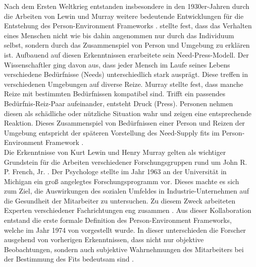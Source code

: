 Nach dem Ersten Weltkrieg entstanden insbesondere in den 1930er-Jahren durch die Arbeiten von Lewin und Murray weitere bedeutende Entwicklungen für die Entstehung des Person-Environment Frameworks \cite[S. 1]{edwards:1990}. \textcite[S. 11f.]{lewin:1936} stellte fest, dass das Verhalten eines Menschen nicht wie bis dahin angenommen nur durch das Individuum selbst, sondern durch das Zusammenspiel von Person und Umgebung zu erklären ist. Aufbauend auf diesen Erkenntnissen erarbeitete \textcite[S. 38ff.]{murray:1938} sein Need-Press-Modell. Der Wissenschaftler ging davon aus, dass jeder Mensch im Laufe seines Lebens verschiedene Bedürfnisse (Needs) unterschiedlich stark ausprägt. Diese treffen in verschiedenen Umgebungen auf diverse Reize. Murray stellte fest, dass manche Reize mit bestimmten Bedürfnissen kompatibel sind. Trifft ein passendes Bedürfnis-Reiz-Paar aufeinander, entsteht Druck (Press). Personen nehmen diesen als schädliche oder nützliche Situation wahr und zeigen eine entsprechende Reaktion. Dieses Zusammenspiel von Bedürfnissen einer Person und Reizen der Umgebung entspricht der späteren Vorstellung des Need-Supply fits im Person-Environment Framework \cite[S. 8]{edwards:2008}. \\
Die Erkenntnisse von Kurt Lewin und Henry Murray gelten als wichtiger Grundstein für die Arbeiten verschiedener Forschungsgruppen rund um John R. P. French, Jr. \cite[S. 5]{caplan:1993}. Der Psychologe stellte im Jahr 1963 an der Universität in Michigan ein groß angelegtes Forschungsprogramm vor. Dieses machte es sich zum Ziel, die Auswirkungen des sozialen Umfeldes in Industrie-Unternehmen auf die Gesundheit der Mitarbeiter zu untersuchen. Zu diesem Zweck arbeiteten Experten verschiedener Fachrichtungen eng zusammen \cite[S. 1ff.]{french:1963}. Aus dieser Kollaboration entstand die erste formale Definition des Person-Environment Frameworks, welche im Jahr 1974 von \textcite{copingAndAdaption:1974} vorgestellt wurde. In dieser unterschieden die Forscher ausgehend von vorherigen Erkenntnissen, dass nicht nur objektive Beobachtungen, sondern auch subjektive Wahrnehmungen des Mitarbeiters bei der Bestimmung des Fits bedeutsam sind \cite[S. 4f.]{caplan:1993}\cite[S. 1ff.]{french:1966}. \\

